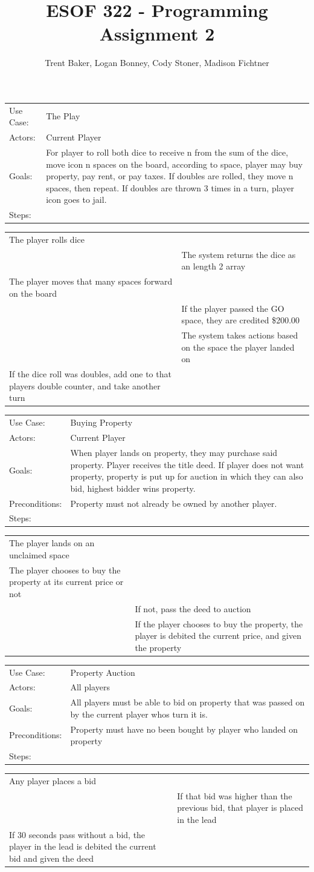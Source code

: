 \documentclass[10pt,letterpaper]{article}
\author{Trent Baker, Logan Bonney, Cody Stoner, Madison Fichtner}
\title{ESOF 322 - Programming Assignment 2}
\newcommand{\usecasetwocol}[1]{
\begin{center}
	\begin{tabularx}{0.8\textwidth}{| X X |}
		\hline
		#1 \\
		\hline
	\end{tabularx}
\end{center}
}
\newcommand{\usecasedescription}[1]{
\begin{center}
	\begin{tabularx}{0.8\textwidth}{l X}
		#1
	\end{tabularx}
\end{center}
}
\newcommand{\usecase}[2]{
\usecasedescription{#1}
\usecasetwocol{#2}
}
\begin{document}
\maketitle

\usecase{Use Case: & The Play \\
	Actors: & Current Player \\
	Goals: & For player to roll both dice to receive n from the sum of the dice, move icon n spaces on the board, according to space, player may buy property, pay rent, or pay taxes. If  doubles are rolled, they move n spaces, then repeat. If doubles are thrown 3 times in a  turn, player icon goes to jail. \\
	Steps: &  }{
	The player rolls dice & \\
	&The system returns the dice as an length 2 array \\
	The player moves that many spaces forward on the board &\\
	&If the player passed the GO space, they are credited \$200.00 \\
	&The system takes actions based on the space the player landed on \\
	If the dice roll was doubles, add one to that players double counter, and take another turn&}

\usecase{Use Case: & Buying Property \\
	Actors: & Current Player \\
	Goals: & When player lands on property, they may purchase said property. Player receives the title deed. If player does not want property, property is put up for auction in which they can also bid, highest bidder wins property. \\
	Preconditions: & Property must not already be owned by another player. \\
	Steps: & }{The player lands on an unclaimed space &\\
	The player chooses to buy the property at its current price or not &\\
	&If not, pass the deed to auction \\
	&If the player chooses to buy the property, the player is debited the current price, and  given the property}

\usecase{Use Case: & Property Auction \\
	Actors: & All players \\
	Goals: & All players must be able to bid on property that was passed on by the current player whos turn it is. \\
	Preconditions: & Property must have no been bought by player who landed on property \\
	Steps: &  }{Any player places a bid &\\
	&If that bid was higher than the previous bid, that player is placed in the lead \\
	If 30 seconds pass without a bid, the player in the lead is debited the current bid and given the deed&}
\end{document}
